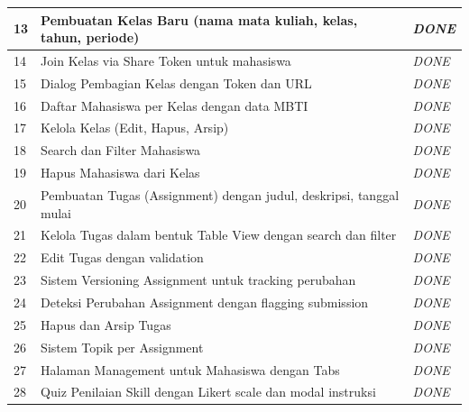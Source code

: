 \begin{longtable}{|p{}|p{}|p{}|}
	\hline
	13          & Pembuatan Kelas Baru (nama mata kuliah, kelas, tahun, periode)               & \textit{DONE}        \\
	\hline
	14          & Join Kelas via Share Token untuk mahasiswa                                   & \textit{DONE}        \\
	\hline
	15          & Dialog Pembagian Kelas dengan Token dan URL                                  & \textit{DONE}        \\
	\hline
	16          & Daftar Mahasiswa per Kelas dengan data MBTI                                  & \textit{DONE}        \\
	\hline
	17          & Kelola Kelas (Edit, Hapus, Arsip)                                            & \textit{DONE}        \\
	\hline
	18          & Search dan Filter Mahasiswa                                                  & \textit{DONE}        \\
	\hline
	19          & Hapus Mahasiswa dari Kelas                                                   & \textit{DONE}        \\
	\hline
	20          & Pembuatan Tugas (Assignment) dengan judul, deskripsi, tanggal mulai          & \textit{DONE}        \\
	\hline
	21          & Kelola Tugas dalam bentuk Table View dengan search dan filter                & \textit{DONE}        \\
	\hline
	22          & Edit Tugas dengan validation                                                 & \textit{DONE}        \\
	\hline
	23          & Sistem Versioning Assignment untuk tracking perubahan                        & \textit{DONE}        \\
	\hline
	24          & Deteksi Perubahan Assignment dengan flagging submission                      & \textit{DONE}        \\
	\hline
	25          & Hapus dan Arsip Tugas                                                        & \textit{DONE}        \\
	\hline
	26          & Sistem Topik per Assignment                                                  & \textit{DONE}        \\
	\hline
	27          & Halaman Management untuk Mahasiswa dengan Tabs                               & \textit{DONE}        \\
	\hline
	28          & Quiz Penilaian Skill dengan Likert scale dan modal instruksi                 & \textit{DONE}        \\

\end{longtable}
